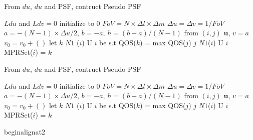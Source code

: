 \begin{algorithm}
\caption{From $du$, $du$ and PSF,  contruct Pseudo PSF}
\label{CHalgorithm}
\begin{algorithmic}[1]
\State $Ldu$ and $Ldv=0$ initialize to $0$
\State $FoV = N \times \Delta l \times \Delta m$
\State $\Delta u=\Delta v=1/FoV$
\State $a=-(N-1)\times \Delta u /2$, $b=-a$, $h=(b-a)/(N-1)$
\State from $(i,j)$ $\mathbf{u}$, $v=a$
\State $v_{0}=v_{0}+()$
\State let $k$  $N1$ ($i$) U {$i$} be s.t
\State QOS($k$) = max {QOS($j$) \textbar $j$  $N1$($i$)  U $i$}
\State MPRSet($i$) = $k$
\EndFor
\EndFor
\EndProcedure
\end{algorithmic}
\end{algorithm}


\begin{algorithm}
\caption{From $du$, $du$ and PSF,  contruct Pseudo PSF}
\label{CHalgorithm}
\begin{algorithmic}[1]
\State $Ldu$ and $Ldv=0$ initialize to $0$
\State $FoV = N \times \Delta l \times \Delta m$
\State $\Delta u=\Delta v=1/FoV$
\State $a=-(N-1)\times \Delta u /2$, $b=-a$, $h=(b-a)/(N-1)$
\State from $(i,j)$ $\mathbf{u}$, $v=a$
\State $v_{0}=v_{0}+()$
\State let $k$  $N1$ ($i$) U {$i$} be s.t
\State QOS($k$) = max {QOS($j$) \textbar $j$  $N1$($i$)  U $i$}
\State MPRSet($i$) = $k$
\EndFor
\EndFor
\EndProcedure
\end{algorithmic}
\end{algorithm}begin{alignat}{2}
